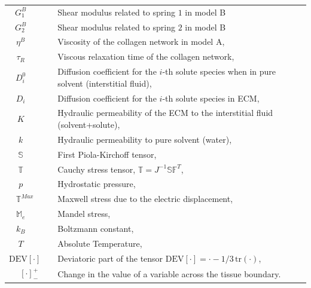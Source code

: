 \documentclass[runningheads]{llncs}
\newcommand{\F}{\ensuremath{\mathbb{F}}}
\begin{document}
\begin{table}[h!]
\begin{tabular}{c  l}
	$G^B_1\qquad$ & Shear modulus related to spring $1$ in model B\\
	$G^B_2\qquad$ & Shear modulus related to spring $2$ in model B\\
	$\eta^B\qquad$ & Viscosity of the collagen network in model A,\\
	$\tau_R\qquad$ & Viscous relaxation time of the collagen network,\\
	$D^0_i\qquad$ & Diffusion coefficient for the $i$-th solute species when in pure solvent (interstitial fluid),\\
	$D_i\qquad$ & Diffusion coefficient for the $i$-th solute species in ECM,\\
	$K\qquad$ &  Hydraulic permeability of the ECM to the interstitial fluid (solvent+solute),\\
	$k\qquad$ &  Hydraulic  permeability  to  pure  solvent (water),\\
	$\mathbb{S}\qquad$ & First Piola-Kirchoff tensor,\\
	$\mathbb{T}\qquad$ & Cauchy stress tensor, $\mathbb{T}=J^{-1}\mathbb{S}\F^T$,\\
	$p\qquad$ & Hydrostatic pressure,\\
	$\mathbb{T}^{Max}\quad$ & Maxwell stress due to the electric displacement,\\
	$\mathbb{M}_e\qquad$ & Mandel stress,\\
	$k_B\qquad$ & Boltzmann constant,\\
	$T\qquad$ & Absolute Temperature, \\
	$\text{DEV}\left[\cdot\right]\quad$ & Deviatoric part of the tensor $\text{DEV}\left[\cdot\right] = \cdot-1/3\, \text{tr}(\cdot)$,\\[2pt]
	$\left[\cdot\right]^+_-$ &  Change in the value of a variable across the tissue boundary.
\end{tabular}	
\end{table}
\newpage
\end{document}
